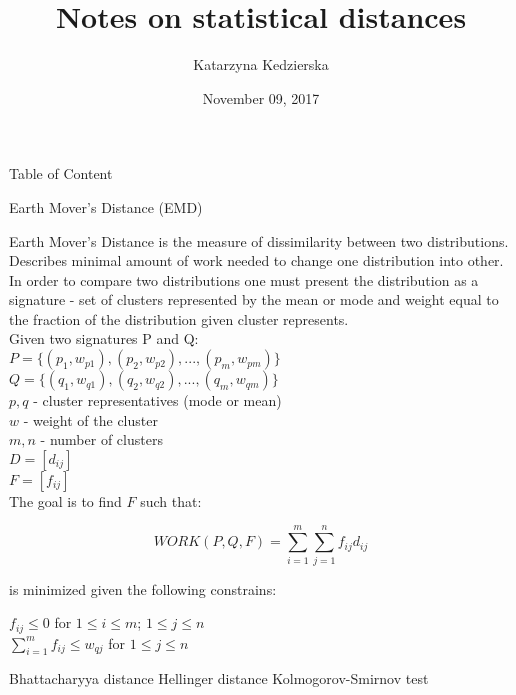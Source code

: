 \documentclass[a4paper,12pt]{article}
\title{Notes on statistical distances}
\date{November 09, 2017}
\author{Katarzyna Kedzierska}
\begin{document}
	\maketitle
	
	
	Table of Content
	
	
	Earth Mover's Distance (EMD)
	
	Earth Mover's Distance is the measure of dissimilarity between two distributions. Describes minimal amount of work needed to change one distribution into other. 
	In order to compare two distributions one must present the distribution as a signature - set of clusters represented by the mean or mode and weight equal to the fraction of the distribution given cluster represents. \\
	
	Given two signatures P and Q: \\
	\(P = \{(p_1, w_{p1}), (p_2, w_{p2}), ..., (p_m, w_{pm})\}\)\\
	\(Q = \{(q_1, w_{q1}), (q_2, w_{q2}), ..., (q_m, w_{qm})\}\)\\
	\(p, q\) - cluster representatives (mode or mean)\\
	\(w\) - weight of the cluster\\
	\(m,n\) - number of clusters\\
	\(D = [d_{ij}]\) \\
	\(F = [f_{ij}]\) \\
	
	The goal is to find \(F\) such that:
	
	\[WORK(P, Q, F) = \sum_{i=1}^{m}\sum_{j=1}^{n}f_{ij}d_{ij}\]
	
	is minimized given the following constrains:
	
$ f_{ij} \le 0$ for $1 \le i \le m$; $1 \le j \le n$ \\
$\sum_{i=1}^{m}f_{ij} \le w_{qj}$ for $1 \le j \le n$ 
	
	
	Bhattacharyya distance
	Hellinger distance
	Kolmogorov-Smirnov test
\end{document}

